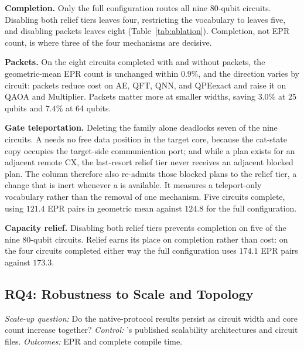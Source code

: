 \textbf{Completion.} Only the full configuration routes all nine 80-qubit
circuits. Disabling both relief tiers leaves four, restricting the vocabulary
to \TeleData{} leaves five, and disabling packets leaves eight
(Table~\ref{tab:ablation}). Completion, not EPR count, is where three of the
four mechanisms are decisive.

\textbf{Packets.} On the eight circuits completed with and without packets,
the geometric-mean EPR count is unchanged within $0.9\%$, and the direction
varies by circuit: packets reduce cost on AE, QFT, QNN, and QPEexact and
raise it on QAOA and Multiplier. Packets matter more at smaller widths,
saving $3.0\%$ at 25 qubits and $7.4\%$ at 64 qubits.

\textbf{Gate teleportation.} Deleting the \TeleGate{} family alone
deadlocks seven of the nine circuits. A \TeleGate{} needs no free data
position in the target core, because the cat-state copy occupies the
target-side communication port; and while a \TeleGate{} plan exists for an
adjacent remote CX, the last-resort relief tier never receives an adjacent
blocked plan. The \TeleData{} column therefore also re-admits those blocked
plans to the relief tier, a change that is inert whenever a \TeleGate{} is
available. It measures a teleport-only vocabulary rather than the removal of
one mechanism. Five circuits complete, using $121.4$ EPR pairs in geometric
mean against $124.8$ for the full configuration.

\textbf{Capacity relief.} Disabling both relief tiers prevents completion on
five of the nine 80-qubit circuits. Relief earns its place on completion
rather than cost: on the four circuits completed either way the full
configuration uses $174.1$ EPR pairs against $173.3$.

\subsection{RQ4: Robustness to Scale and Topology}
\label{sec:scaleup}

\emph{Scale-up question:} Do the native-protocol results persist as circuit
width and core count increase together? \emph{Control:} \dSABRE{}'s
published scalability architectures and circuit files. \emph{Outcomes:}
EPR and complete compile time.

